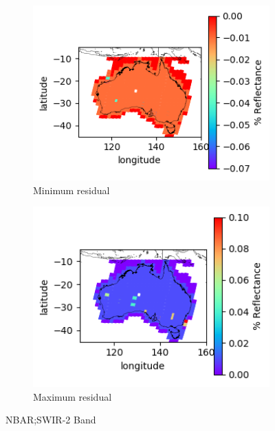 \documentclass[a4paper]{article}
\begin{document}
      \begin{figure}[h!]
        \centering
          \begin{subfigure}[l]{.4\linewidth}
            \hspace{-32mm}
            \includegraphics[scale=0.9]{plots/nbar/nbar_swir_2-MinResidual.png}
            \caption{Minimum residual}
          \end{subfigure}
%
          \begin{subfigure}[r]{.4\linewidth}
            \includegraphics[scale=0.9]{plots/nbar/nbar_swir_2-MaxResidual.png}
            \caption{Maximum residual}
          \end{subfigure}
        \caption{NBAR;\@ SWIR-2 Band}\label{figure:14}
      \end{figure}

  \clearpage
\end{document}
